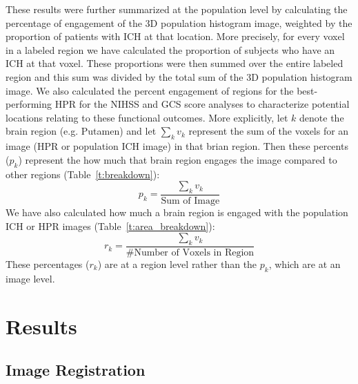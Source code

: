 \documentclass[10pt]{article}\usepackage[]{graphicx}\usepackage[]{color}
\begin{document}
These results were further summarized at the population level by calculating the percentage of engagement of the 3D population histogram image, weighted by the proportion of patients with ICH at that location.  More precisely, for every voxel in a labeled region we have calculated the proportion of subjects who have an ICH at that voxel. These proportions were then summed over the entire labeled region and this sum was divided by the total sum of the 3D population histogram image.
We also calculated the percent engagement of regions for the best-performing HPR for the NIHSS and GCS score analyses to characterize potential locations relating to these functional outcomes.  
More explicitly, let $k$ denote the brain region (e.g. Putamen) and let $\sum_{k} v_{k}$ represent the sum of the voxels for an image (HPR or population ICH image) in that brian region. Then these percents ($p_{k}$) represent the how much that brain region engages the image compared to other regions (Table~\ref{t:breakdown}):
$$
	p_{k} = \frac{\sum_{k} v_{k}}{\text{Sum of Image}}
$$
We have also calculated how much a brain region is engaged with the population ICH or HPR images (Table~\ref{t:area_breakdown}):
$$
	r_{k} = \frac{\sum_{k} v_{k}}{\# \text{Number of Voxels in Region}}
$$
These percentages ($r_{k}$) are at a region level rather than the $p_k$, which are at an image level.





\section{Results}


\subsection{Image Registration}
\end{document}
